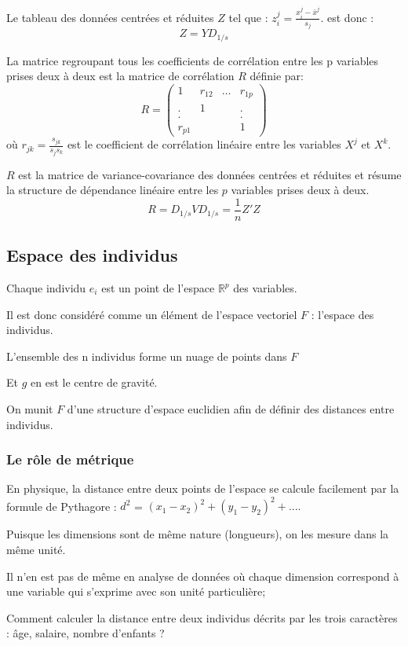 \documentclass[12pt,a4paper]{article}
\begin{document}
Le tableau des données centrées et réduites $Z$ tel que :
$z_{i}^j = \frac{x_{i}^j - \bar{x}^{j}}{s_j}$.
est donc : \[Z = Y D_{1/s}\]

La matrice regroupant tous les coefficients de corrélation entre les p variables prises deux à deux est la matrice de corrélation $R$ définie par:
\[R = \begin{pmatrix}
1 & r_{12} & \dots & r_{1p} \\
. & 1 &  & . \\
. &  &  & . \\
r_{p1} &  &  & 1
\end{pmatrix}\]
où $r_{jk} = \frac{s_{jk}}{s_j s_k}$ est le coefficient de corrélation linéaire entre les variables $X^{j}$ et $X^{k}$.

$R$ est la matrice de variance-covariance des données centrées et réduites et résume la structure de dépendance linéaire entre les $p$ variables prises deux à deux.
\[R = D_{1/s} V D_{1/s} = \frac{1}{n} Z' Z\]

\subsection{Espace des individus}

Chaque individu $e_i$ est un point de l'espace $\mathbb{R}^p$ des variables. 

Il est donc considéré comme un élément de l'espace vectoriel $F$ : l'espace des individus.

L'ensemble des n individus forme un nuage de points dans $F$

Et $g$ en est le centre de gravité.

On munit $F$ d'une structure d'espace euclidien afin de définir des distances entre individus.

\subsubsection{Le rôle de métrique}

En physique, la distance entre deux points de l'espace se calcule facilement par la formule de Pythagore : 
$d^2$ = $(x_1 - x_2)^2 + (y_1 - y_2)^2 + ....$

Puisque les dimensions sont de même nature (longueurs), on les mesure dans la même unité.

Il n'en est pas de même en analyse de données où chaque dimension correspond à une variable qui s'exprime avec son unité particulière;

Comment calculer la distance entre deux individus décrits par les trois caractères : âge, salaire, nombre d'enfants ?
\end{document}

